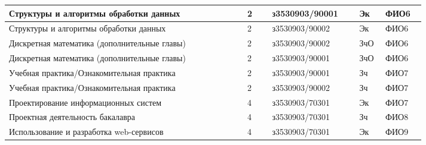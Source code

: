 \begin{table}[htbp]
\begin{tabular}{|p{0.48\linewidth}|p{0.05\linewidth}|p{0.16\linewidth}|p{0.04\linewidth}|p{0.08\linewidth}|}
		Структуры и алгоритмы обработки данных                                        & 2                                                & з3530903/90001                                     & Эк                                                         & ФИО6          \\	\hline
		Структуры и алгоритмы обработки данных                                        & 2                                                & з3530903/90002                                     & Эк                                                         & ФИО6          \\	\hline
		Дискретная математика (дополнительные главы)                                  & 2                                                & з3530903/90002                                     & ЗчО                                                        & ФИО6          \\	\hline
		Дискретная математика (дополнительные главы)                                  & 2                                                & з3530903/90001                                     & ЗчО                                                        & ФИО6          \\	\hline
		Учебная практика/Ознакомительная практика                                     & 2                                                & з3530903/90001                                     & Зч                                                         & ФИО7          \\	\hline
		Учебная практика/Ознакомительная практика                                     & 2                                                & з3530903/90002                                     & Зч                                                         & ФИО7          \\	\hline
		Проектирование информационных систем                                          & 4                                                & з3530903/70301                                     & Эк                                                         & ФИО7          \\	\hline
		Проектная деятельность бакалавра                                              & 4                                                & з3530903/70301                                     & Зч                                                         & ФИО8          \\
		Использование и разработка web-сервисов                                       & 4                                                & з3530903/70301                                     & Эк                                                         & ФИО9          \\	\hline

\end{tabular}
\end{table}
